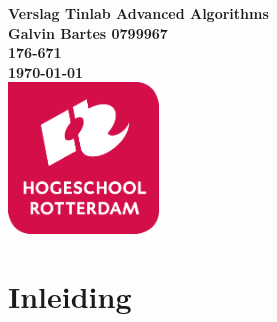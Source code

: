 \documentclass{article}
\begin{document}
	\sffamily
	\begin{titlepage}
		\centering
		\vfill
		{\bfseries\Huge
			Verslag Tinlab Advanced Algorithms \\
			\vskip2cm
		}
		{\bfseries\Large
			Galvin Bartes 0799967\\
		}
		{
			\bfseries\normalsize
			176-671\\
			\vskip1cm
			\today\\
		}    
		\vfill
		\includegraphics[width=4cm]{logohr.png} %
		\vfill
		\vfill
	\end{titlepage}
	\newpage
	\tableofcontents
	
	\newpage
	\section{Inleiding}
	
\end{document}
